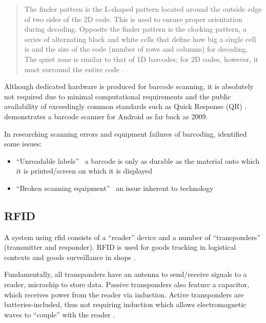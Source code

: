 \blockquote { The finder pattern is the L-shaped pattern
  located around the outside edge of two sides of the 2D
  code.
  This is used to ensure proper orientation during decoding.
  Opposite the finder pattern is the clocking pattern, a
  series of alternating black and white cells that define how
  big a single cell is and the size of the code (number of
  rows and columns) for decoding.
  The quiet zone is similar to that of 1D barcodes; for 2D
  codes, however, it must surround the entire code
  \parencite{whatIsABarcode}.
}

Although dedicated hardware is produced for barcode
scanning, it is absolutely not required due to minimal
computational requirements and the public availability of
exceedingly common standards such as Quick Response (QR)
\parencite{qrCodeStandard}.
\cite{androidBarcodeScanner} demonstrates a barcode scanner
for Android as far back as 2009.

In researching scanning errors and equipment failures of
barcoding, \cite{barcodeRfidComparison} identified some
issues: 

\begin{itemize} 

  \item \enquote{Unreadable labels} \textemdash~a barcode is
        only as durable as the material onto which it is
        printed/screen on which it is displayed 

  \item \enquote{Broken scanning equipment} \textemdash~an
        issue inherent to technology 

\end{itemize} 

\subsection{RFID} \label{ss:rfid} 

A system using \gls{rfid} consists of a \enquote{reader}
device and a number of \enquote{transponders} (transmitter
and responder).
RFID is used for goods tracking in logistical contexts and
goods surveillance in shops \parencite{whatIsRfid}.

Fundamentally, all transponders have an antenna to
send/receive signals to a reader, microchip to store data.
Passive transponders also feature a capacitor, which
receives power from the reader via induction.
Active transponders are batteries-included, thus not
requiring induction which allows electromagnetic waves to
\enquote{couple} with the reader \parencite{whatIsRfid}.

